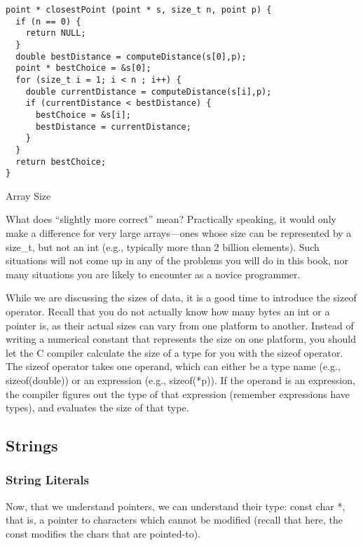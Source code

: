\documentclass[11pt, a4paper]{article}
\begin{document}
\begin{listing}
\begin{verbatim}
point * closestPoint (point * s, size_t n, point p) {
  if (n == 0) {
    return NULL;
  }
  double bestDistance = computeDistance(s[0],p);
  point * bestChoice = &s[0];
  for (size_t i = 1; i < n ; i++) {
    double currentDistance = computeDistance(s[i],p);
    if (currentDistance < bestDistance) {
      bestChoice = &s[i];
      bestDistance = currentDistance;
    }
  }
  return bestChoice;
}
\end{verbatim}
\caption{Array Size}
\label{lst:array_size}
\end{listing}



What does “slightly more correct” mean? Practically speaking, it would only make a difference for very large arrays—ones whose size can be represented by a size\_t, but not an int (e.g., typically more than 2 billion elements). Such situations will not come up in any of the problems you will do in this book, nor many situations you are likely to encounter as a novice programmer.

While we are discussing the sizes of data, it is a good time to introduce the sizeof operator. Recall that you do not actually know how many bytes an int or a pointer is, as their actual sizes can vary from one platform to another. Instead of writing a numerical constant that represents the size on one platform, you should let the C compiler calculate the size of a type for you with the sizeof operator. The sizeof operator takes one operand, which can either be a type name (e.g., sizeof(double)) or an expression (e.g., sizeof(*p)). If the operand is an expression, the compiler figures out the type of that expression (remember expressions have types), and evaluates the size of that type. 


\subsection{Strings}%
\label{sub:strings}

\subsubsection{String Literals}%
\label{ssub:string_literals}

Now, that we understand pointers, we can understand their type: const char *, that is, a pointer to characters which cannot be modified (recall that here, the const modifies the chars that are pointed-to).
\end{document}
